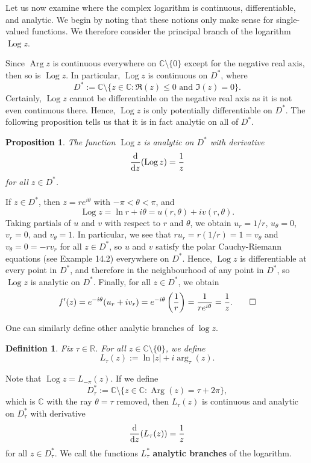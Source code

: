 \documentclass[10pt]{article}
\makeatletter
\newcommand{\R}{\mathbb{R}}
\newcommand{\C}{\mathbb{C}}
\DeclareMathOperator{\Arg}{Arg}
\DeclareMathOperator{\Log}{Log}
\theoremstyle{newstyle}
\newtheorem{prop}[thm]{Proposition}
\newtheorem{defn}[thm]{Definition}
\newenvironment{pf}[1][\proofname]{\par
  \pushQED{\qed}%
  \normalfont \topsep0\p@\relax
  \trivlist
  \item[\hskip\labelsep\scshape
  #1\@addpunct{.}]\ignorespaces
}{%
  \popQED\endtrivlist\@endpefalse
}
\makeatother
\begin{document}
Let us now examine where the complex logarithm is continuous, differentiable, and analytic. 
We begin by noting that these notions only make sense for single-valued functions. We therefore 
consider the principal branch of the logarithm $\Log z$. 

Since $\Arg z$ is continuous everywhere on $\C \setminus \{0\}$ except for the negative real axis, 
then so is $\Log z$. In particular, $\Log z$ is continuous on $D^*$, where 
\[ D^* := \C \setminus \{z \in \C : \Re(z) \leq 0 \text{ and } \Im(z) = 0\}. \]
Certainly, $\Log z$ cannot be differentiable on the negative real axis as it is not even continuous there.
Hence, $\Log z$ is only potentially differentiable on $D^*$. The following proposition tells us that 
it is in fact analytic on all of $D^*$. 

\begin{prop}
The function $\Log z$ is analytic on $D^*$ with derivative 
\[ \frac{\rm d}{{\rm d}z} (\Log z) = \frac1z \]
for all $z \in D^*$. 
\end{prop}
\begin{pf}
If $z \in D^*$, then $z = re^{i\theta}$ with $-\pi < \theta < \pi$, and 
\[ \Log z = \ln r + i\theta = u(r, \theta) + iv(r, \theta). \]
Taking partials of $u$ and $v$ with respect to $r$ and $\theta$, we obtain 
$u_r = 1/r$, $u_\theta = 0$, $v_r = 0$, and $v_\theta = 1$. In particular, we see that 
$ru_r = r(1/r) = 1 = v_\theta$ and $v_\theta = 0 = -rv_r$ for all $z \in D^*$, so 
$u$ and $v$ satisfy the polar Cauchy-Riemann equations (see Example 14.2) everywhere on $D^*$. 
Hence, $\Log z$ is differentiable at every point in $D^*$, and therefore in the neighbourhood 
of any point in $D^*$, so $\Log z$ is analytic on $D^*$. Finally, for all $z \in D^*$, we obtain
\[ f'(z) = e^{-i\theta} (u_r + iv_r) = e^{-i\theta} \left(\frac1r\right) = \frac1{re^{i\theta}} = 
\frac1z. \qedhere  \]
\end{pf}

One can similarly define other analytic branches of $\log z$. 

\begin{defn}
Fix $\tau \in \R$. For all $z \in \C \setminus \{0\}$, we define 
\[ L_\tau(z) := \ln|z| + i\arg_\tau(z). \]
\end{defn}

Note that $\Log z = L_{-\pi}(z)$. If we define 
\[ D_\tau^* := \C \setminus \{z \in \C : \Arg(z) = \tau + 2\pi\}, \] 
which is $\C$ with the ray $\theta = \tau$ removed, then $L_\tau(z)$ is continuous and analytic 
on $D_\tau^*$ with derivative 
\[ \frac{\rm d}{{\rm d}z} (L_\tau(z)) = \frac1z \]
for all $z \in D_\tau^*$. We call the functions $L_\tau^*$ {\bf analytic branches} of the logarithm. 
\end{document}
